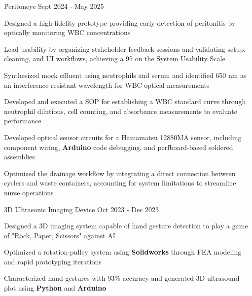\documentclass[11pt, a4paper]{russell}
\begin{document}
\begin{cventries}
\cvproject
  {Peritoneye} %
  {Sept 2024 - May 2025} %
  {
    \begin{cvitems}
        \item {Designed a high-fidelity prototype providing early detection of peritonitis by optically monitoring WBC concentrations}
        \item {Lead usability by organizing stakeholder feedback sessions and validating setup, cleaning, and UI workflows, achieving a 95 on the System Usability Scale}  
        \item {Synthesized mock effluent using neutrophils and serum and identified 650 nm as an interference-resistant wavelength for WBC optical measurements} 
        \item {Developed and executed a SOP for establishing a WBC standard curve through neutrophil dilutions, cell counting, and absorbance measurements to evaluate performance}
        \item {Developed optical sensor circuits for a Hamamatsu 12880MA sensor, including component wiring, \textbf{Arduino} code debugging, and perfboard-based soldered assemblies} 
        \item {Optimized the drainage workflow by integrating a direct connection between cyclers and waste containers, accounting for system limitations to streamline nurse operations}
    \end{cvitems}
  }

\cvproject
  {3D Ultrasonic Imaging Device} %
  {Oct 2023 - Dec 2023} %
  {
    \begin{cvitems}
        \item {Designed a 3D imaging system capable of hand gesture detection to play a game of "Rock, Paper, Scissors" against AI}
        \item {Optimized a rotation-pulley system using \textbf{Solidworks} through FEA modeling and rapid prototyping iterations}
        \item {Characterized hand gestures with 93\% accuracy and generated 3D ultrasound plot using \textbf{Python} and \textbf{Arduino}}
    \end{cvitems}
  }
\end{cventries}

\begin{cvskills}
\end{cvskills}

\vspace*{\fill}
\end{document}
